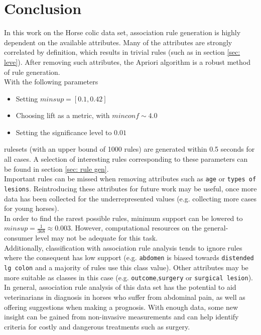 \section{Conclusion}
In this work on the Horse colic data set, association rule generation is highly dependent on the available attributes.
Many of the attributes are strongly correlated by definition, which results in trivial rules (such as in section \ref{sec: leve}). After removing such attributes, the Apriori algorithm is a robust method of rule generation.\\

\noindent
With the following parameters
\begin{itemize}
\item Setting $minsup = \left[0.1, 0.42 \right]$
\item Choosing lift as a metric, with $minconf \sim 4.0$
\item Setting the significance level to $0.01$
\end{itemize}
rulesets (with an upper bound of 1000 rules) are generated within 0.5 seconds for all cases. A selection of  interesting rules corresponding to these parameters can be found in section \ref{sec: rule gen}.\\

\noindent
Important rules can be missed when removing attributes such as \verb|age| or \verb|types of lesions|. Reintroducing these attributes for future work may be useful, once more data has been collected for the underrepresented values (e.g. collecting more cases for young horses).\\

\noindent
In order to find the rarest possible rules, minimum support can be lowered to $minsup = \frac{1}{368} \approx 0.003$. However, computational resources on the general-consumer level may not be adequate for this task.\\


\noindent
Additionally, classification with association rule analysis tends to ignore rules where the consequent has low support (e.g. \verb|abdomen| is biased towards \verb|distended lg colon| and a majority of rules use this class value). Other attributes may be more suitable as classes in this case (e.g. \verb|outcome|,\verb|surgery| or \verb|surgical lesion|).\\


\noindent
In general, association rule analysis of this data set has the potential to aid veterinarians in diagnosis in horses who suffer from abdominal pain, as well as offering suggestions when making a prognosis. With enough data, some new insight can be gained from non-invasive measurements and can help identify criteria for costly and dangerous treatments such as surgery.

